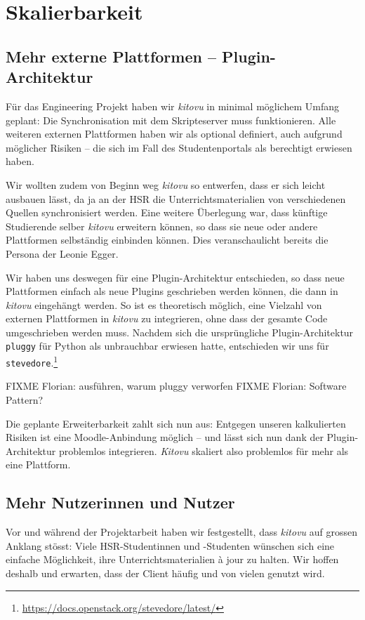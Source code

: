 \documentclass[a4paper]{article}
\let\oldsection\section
\renewcommand\section{\clearpage\oldsection}
\begin{document}
\section{Skalierbarkeit}

\subsection{Mehr externe Plattformen -- Plugin-Architektur}

Für das Engineering Projekt haben wir \emph{kitovu} in minimal möglichem Umfang geplant: Die Synchronisation mit dem Skripteserver muss funktionieren. Alle weiteren externen Plattformen haben wir als optional definiert, auch aufgrund möglicher Risiken -- die sich im Fall des Studentenportals als berechtigt erwiesen haben.

Wir wollten zudem von Beginn weg \emph{kitovu} so entwerfen, dass er sich leicht ausbauen lässt, da ja an der HSR die Unterrichtsmaterialien von verschiedenen Quellen synchronisiert werden. Eine weitere Überlegung war, dass künftige Studierende selber \emph{kitovu} erweitern können, so dass sie neue oder andere Plattformen selbständig einbinden können. Dies veranschaulicht bereits die Persona der Leonie Egger. 

Wir haben uns deswegen für eine Plugin-Architektur entschieden, so dass neue Plattformen einfach als neue Plugins geschrieben werden können, die dann in \emph{kitovu} eingehängt werden. So ist es theoretisch möglich, eine Vielzahl von externen Plattformen in \emph{kitovu} zu integrieren, ohne dass der gesamte Code umgeschrieben werden muss. Nachdem sich die ursprüngliche Plugin-Architektur \verb|pluggy| für Python als unbrauchbar erwiesen hatte, entschieden wir uns für \verb|stevedore|.\footnote{\url{https://docs.openstack.org/stevedore/latest/}}

FIXME Florian: ausführen, warum pluggy verworfen
FIXME Florian: Software Pattern?

Die geplante Erweiterbarkeit zahlt sich nun aus: Entgegen unseren kalkulierten Risiken ist eine Moodle-Anbindung möglich -- und lässt sich nun dank der Plugin-Architektur problemlos integrieren. \emph{Kitovu} skaliert also problemlos für mehr als eine Plattform.


\subsection{Mehr Nutzerinnen und Nutzer}

Vor und während der Projektarbeit haben wir festgestellt, dass \emph{kitovu} auf grossen Anklang stösst: Viele HSR-Studentinnen und -Studenten wünschen sich eine einfache Möglichkeit, ihre Unterrichtsmaterialien à jour zu halten. Wir hoffen deshalb und erwarten, dass der Client häufig und von vielen genutzt wird.
\end{document}
